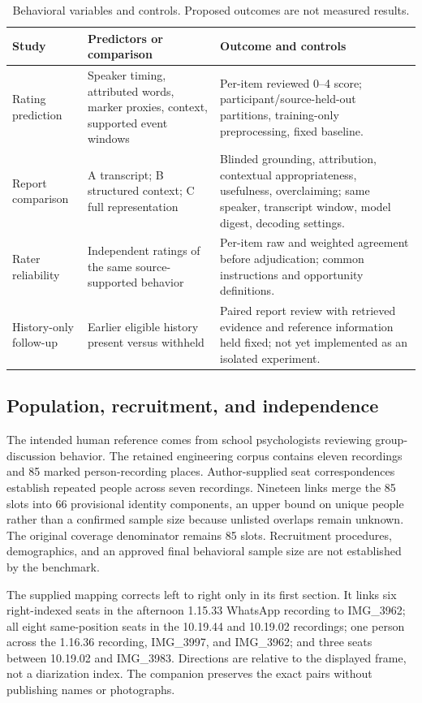 \documentclass{article}
\begin{document}
\begin{table}[ht]
\caption{Behavioral variables and controls. Proposed outcomes are not measured results.}
\label{tab:variables}
\centering\small
\begin{tabularx}{\linewidth}{@{}l Y Y@{}}
\toprule Study & Predictors or comparison & Outcome and controls \\
\midrule
Rating prediction & Speaker timing, attributed words, marker proxies, context, supported event windows & Per-item reviewed 0--4 score; participant/source-held-out partitions, training-only preprocessing, fixed baseline. \\
Report comparison & A transcript; B structured context; C full representation & Blinded grounding, attribution, contextual appropriateness, usefulness, overclaiming; same speaker, transcript window, model digest, decoding settings. \\
Rater reliability & Independent ratings of the same source-supported behavior & Per-item raw and weighted agreement before adjudication; common instructions and opportunity definitions. \\
History-only follow-up & Earlier eligible history present versus withheld & Paired report review with retrieved evidence and reference information held fixed; not yet implemented as an isolated experiment. \\
\bottomrule
\end{tabularx}
\end{table}

\subsection{Population, recruitment, and independence}
The intended human reference comes from school psychologists reviewing group-discussion behavior. The retained engineering corpus contains eleven recordings and 85 marked person-recording places. Author-supplied seat correspondences establish repeated people across seven recordings. Nineteen links merge the 85 slots into 66 provisional identity components, an upper bound on unique people rather than a confirmed sample size because unlisted overlaps remain unknown. The original coverage denominator remains 85 slots. Recruitment procedures, demographics, and an approved final behavioral sample size are not established by the benchmark.

The supplied mapping corrects left to right only in its first section. It links six right-indexed seats in the afternoon 1.15.33 WhatsApp recording to IMG\_3962; all eight same-position seats in the 10.19.44 and 10.19.02 recordings; one person across the 1.16.36 recording, IMG\_3997, and IMG\_3962; and three seats between 10.19.02 and IMG\_3983. Directions are relative to the displayed frame, not a diarization index. The companion  preserves the exact pairs without publishing names or photographs.
\end{document}
